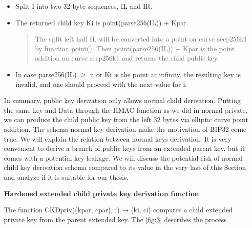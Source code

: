 \begin{adjustwidth}{0.5cm}{}
\begin{itemize}
        \item Split I into two 32-byte sequences, IL and IR.
              \bigskip

        \item The returned child key Ki is point(parse256(IL)) + Kpar.

              \begin{quote}
                  The split left half IL will be converted into a point on curve secp256k1 by function point(). Then point(parse256(IL)) + Kpar is the point addition on curve secp256k1 and returns the child public key.
              \end{quote}
              \bigskip

        \item In case parse256(IL) $\geq$ n or Ki is the point at infinity, the resulting key is invalid, and one should proceed with the next value for i.

    \end{itemize}

    In summary, public key derivation only allows normal child derivation.
    Putting the same key and Data through the HMAC function as we did in normal private, we can produce the child public key from the left 32 bytes via elliptic curve point addition.
    The schema normal key derivation make the motivation of BIP32 come true. We will explain the relation between normal keys derivation.
    It is very convenient to derive a branch of public keys from an extended parent key, but it comes with a potential key leakage.
    We will discuss the potential risk of normal child key derivation schema compared to its value in the very last of this Section and analyze if it is suitable for our thesis.


    \bigskip
    {\textbf{Hardened extended child private key derivation function}}

    The function CKDpriv((kpar, cpar), i) → (ki, ci) computes a child extended private key from the parent extended key.
    The \autoref{fig:3} describes the process.


\end{adjustwidth}
